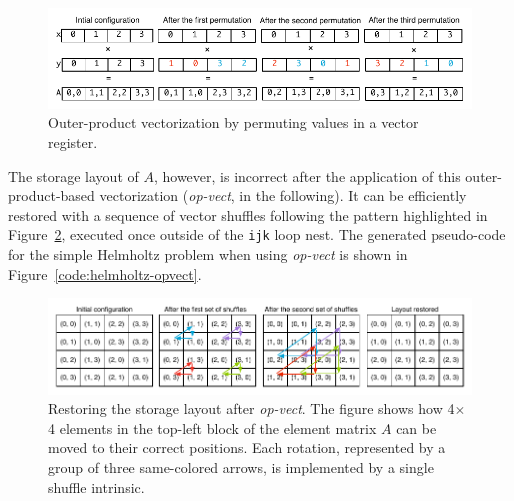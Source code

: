 \documentclass[conference]{IEEEtran}
\begin{document}

\begin{figure}[b]
\centerline{\includegraphics[scale=0.6]{Pictures/vect-by-vect-inline.pdf}}
\caption{Outer-product vectorization by permuting values in a vector register.}
\label{fig:vect-by-vect}
\end{figure}

The storage layout of $A$, however, is incorrect after the application of this outer-product-based vectorization (\emph{op-vect}, in the following). It can be efficiently restored with a sequence of vector shuffles following the pattern highlighted in Figure~\ref{fig:restore-layout}, executed once outside of the \texttt{ijk} loop nest. The generated pseudo-code for the simple Helmholtz problem when using \emph{op-vect} is shown in Figure~\ref{code:helmholtz-opvect}.

\begin{figure}[t]
\centerline{\includegraphics[scale=0.60]{Pictures/vect-restore-inline.pdf}}
\caption{Restoring the storage layout after \emph{op-vect}. The figure shows how 4$\times$4 elements in the top-left block of the element matrix $A$ can be moved to their correct positions. Each rotation, represented by a group of three same-colored arrows, is implemented by a single shuffle intrinsic.}
\label{fig:restore-layout}
\end{figure}

\end{document}
